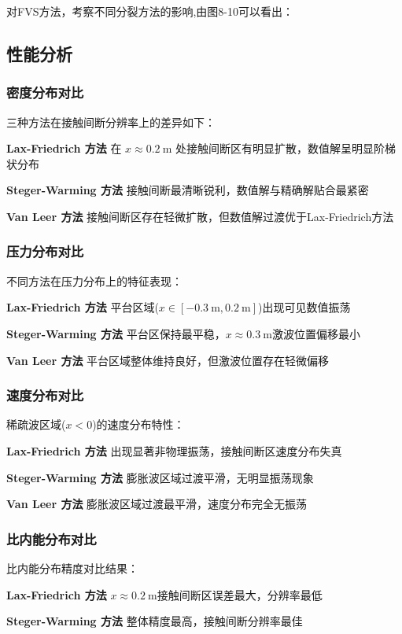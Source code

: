 \documentclass[12pt,a4paper]{article}
\begin{document}
对FVS方法，考察不同分裂方法的影响,由图8-10可以看出：

\subsection{性能分析}

\subsubsection{密度分布对比}
三种方法在接触间断分辨率上的差异如下：

\textbf{Lax-Friedrich 方法} 
在 $x \approx \SI{0.2}{\meter}$ 处接触间断区有明显扩散，数值解呈明显阶梯状分布

\textbf{Steger-Warming 方法}
接触间断最清晰锐利，数值解与精确解贴合最紧密

\textbf{Van Leer 方法}
接触间断区存在轻微扩散，但数值解过渡优于Lax-Friedrich方法

\subsubsection{压力分布对比}
不同方法在压力分布上的特征表现：

\textbf{Lax-Friedrich 方法}
平台区域($x \in [\SI{-0.3}{\meter}, \SI{0.2}{\meter}]$)出现可见数值振荡

\textbf{Steger-Warming 方法}
平台区保持最平稳，$x \approx \SI{0.3}{\meter}$激波位置偏移最小

\textbf{Van Leer 方法}
平台区域整体维持良好，但激波位置存在轻微偏移

\subsubsection{速度分布对比}
稀疏波区域($x < 0$)的速度分布特性：

\textbf{Lax-Friedrich 方法}
出现显著非物理振荡，接触间断区速度分布失真

\textbf{Steger-Warming 方法}
膨胀波区域过渡平滑，无明显振荡现象

\textbf{Van Leer 方法}
膨胀波区域过渡最平滑，速度分布完全无振荡

\subsubsection{比内能分布对比}
比内能分布精度对比结果：

\textbf{Lax-Friedrich 方法}
$x \approx \SI{0.2}{\meter}$接触间断区误差最大，分辨率最低

\textbf{Steger-Warming 方法}
整体精度最高，接触间断分辨率最佳
\end{document}
